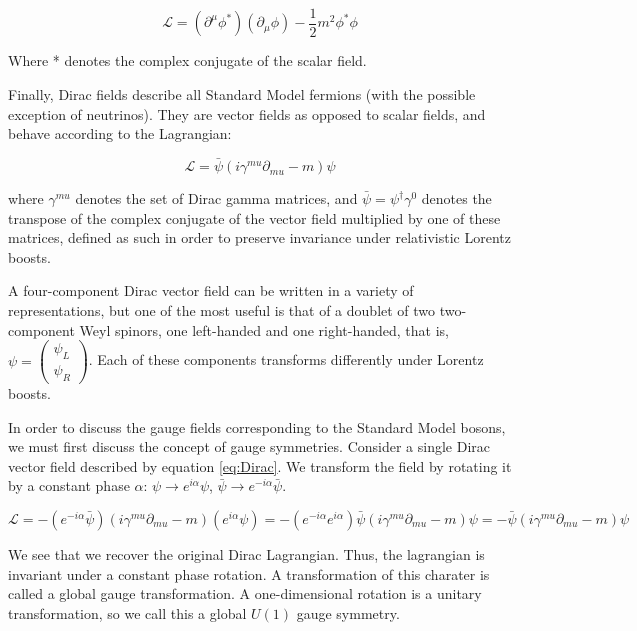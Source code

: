 \begin{equation}
\mathcal{L} = (\partial^{\mu}\phi^{*})(\partial_{\mu}\phi) - \frac{1}{2} m^{2} \phi^{*} \phi
\end{equation}

Where * denotes the complex conjugate of the scalar field.

Finally, Dirac fields describe all Standard Model fermions (with the possible exception of neutrinos). They are vector fields as opposed to scalar fields, and behave according to the Lagrangian:

\begin{equation}
\mathcal{L} = \bar{\psi}(i \gamma^{mu} \partial_{mu} - m) \psi
\end{equation}

where $\gamma^{mu}$ denotes the set of Dirac gamma matrices, and $\bar{\psi} = \psi^{\dagger} \gamma^0$ denotes the transpose of the complex conjugate of the vector field multiplied by one of these matrices, defined as such in order to preserve invariance under relativistic Lorentz boosts. 

A four-component Dirac vector field can be written in a variety of representations, but one of the most useful is that of a doublet of two two-component Weyl spinors, one left-handed and one right-handed, that is, $\psi = \begin{pmatrix} \psi_L \\ \psi_R \end{pmatrix}$. Each of these components transforms differently under Lorentz boosts.

In order to discuss the gauge fields corresponding to the Standard Model bosons, we must first discuss the concept of gauge symmetries. Consider a single Dirac vector field described by equation \ref{eq:Dirac}. We transform the field by rotating it by a constant phase $\alpha$:  $\psi \rightarrow e^{i \alpha} \psi $, $\bar{\psi} \rightarrow e^{-i \alpha} \bar{\psi} $.

\begin{equation}
\mathcal{L} = - (e^{-i \alpha} \bar{\psi})(i \gamma^{mu} \partial_{mu} - m) (e^{i \alpha} \psi)
= - (e^{-i \alpha} e^{i \alpha})\bar{\psi} (i \gamma^{mu} \partial_{mu} - m)\psi
= -\bar{\psi}(i \gamma^{mu} \partial_{mu} - m) \psi
\end{equation}

We see that we recover the original Dirac Lagrangian. Thus, the lagrangian is invariant under a constant phase rotation. A transformation of this charater is called a global gauge transformation. A one-dimensional rotation is a unitary transformation, so we call this a global $U(1)$ gauge symmetry.


